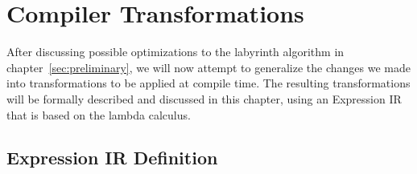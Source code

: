 %
\chapter{Compiler Transformations}
\label{sec:transformations}

After discussing possible optimizations to the labyrinth algorithm in chapter~\ref{sec:preliminary}, we will now attempt to generalize the changes we made into transformations to be applied at compile time.
The resulting transformations will be formally described and discussed in this chapter, using an Expression IR that is based on the lambda calculus.

\section{Expression IR Definition}%
\label{sec:transformations:expression-ir}

